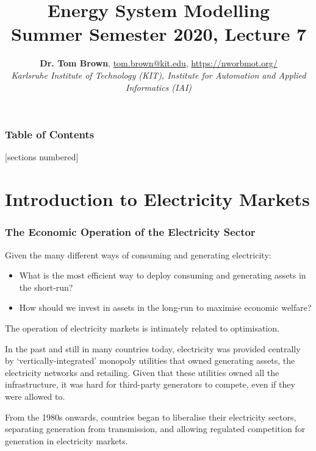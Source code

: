 \documentclass[10pt,aspectratio=169,dvipsnames]{beamer}
\title{Energy System Modelling\\ Summer Semester 2020, Lecture 7}
\author{
  {\bf Dr. Tom Brown}, \href{mailto:tom.brown@kit.edu}{tom.brown@kit.edu}, \url{https://nworbmot.org/}\\
  \emph{Karlsruhe Institute of Technology (KIT), Institute for Automation and Applied Informatics (IAI)}
}
\date{}
\let\olditem\item
\renewcommand{\item}{%
\olditem\vspace{5pt}}
\begin{document}
\maketitle


\begin{frame}

  \frametitle{Table of Contents}
  [sections numbered]
  \tableofcontents[hideallsubsections]
\end{frame}


\section{Introduction to Electricity Markets}


\begin{frame}
  \frametitle{The Economic Operation of the Electricity Sector}


  Given the many different ways of consuming and generating
  electricity:

  \begin{itemize}
    \item   What is the \alert{most efficient} way to deploy consuming and generating
  assets in the short-run?
    \item How should we invest in assets in the long-run to \alert{maximise economic welfare}?
  \end{itemize}

  The operation of electricity markets is intimately related to
  \alert{optimisation}.

  In the past and still in many countries today, electricity was
  provided centrally by `vertically-integrated' monopoly utilities
  that owned generating assets, the electricity networks and
  retailing.  Given that these utilities owned all the infrastructure,
  it was hard for third-party generators to compete, even if they were
  allowed to.

  From the 1980s onwards, countries began to liberalise their
  electricity sectors, separating generation from transmission, and
  allowing regulated competition for generation in \alert{electricity markets}.
\end{frame}
\end{document}
